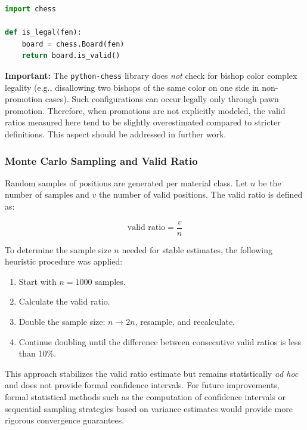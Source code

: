 \documentclass[12pt]{article}
\begin{document}
\begin{lstlisting}[language=Python, caption={Validation of chess positions using python-chess}, label={lst:is_legal}]
import chess

def is_legal(fen):
    board = chess.Board(fen)
    return board.is_valid()
\end{lstlisting}

\noindent
\textbf{Important:} The \texttt{python-chess} library does \emph{not} check for bishop color complex legality 
(e.g., disallowing two bishops of the same color on one side in non-promotion cases). 
Such configurations can occur legally only through pawn promotion. 
Therefore, when promotions are not explicitly modeled, the valid ratios measured here 
tend to be slightly overestimated compared to stricter definitions. 
This aspect should be addressed in further work.

\subsubsection{Monte Carlo Sampling and Valid Ratio}

Random samples of positions are generated per material class. 
Let $n$ be the number of samples and $v$ the number of valid positions. 
The valid ratio is defined as:

\begin{equation}
\text{valid ratio} = \frac{v}{n}
\end{equation}

To determine the sample size $n$ needed for stable estimates, the following heuristic procedure was applied:

\begin{enumerate}
    \item Start with $n = 1000$ samples.
    \item Calculate the valid ratio.
    \item Double the sample size: $n \rightarrow 2n$, resample, and recalculate.
    \item Continue doubling until the difference between consecutive valid ratios is less than 10\%.
\end{enumerate}

\noindent
This approach stabilizes the valid ratio estimate but remains statistically \emph{ad hoc} and 
does not provide formal confidence intervals. For future improvements, formal 
statistical methods such as the computation of confidence intervals or sequential 
sampling strategies based on variance estimates would provide more rigorous 
convergence guarantees.
\end{document}
